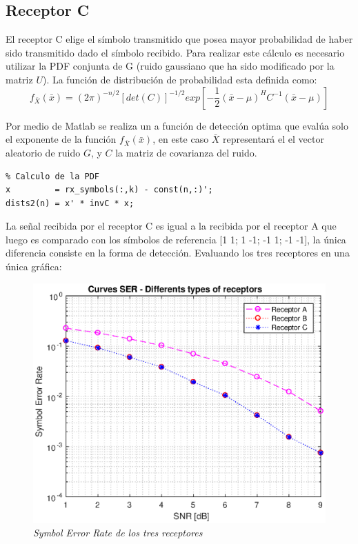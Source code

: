 \documentclass	[12pt,A4paper,titlepage]{article}
\begin{document}
\subsection{Receptor C}
El receptor C elige el símbolo transmitido que posea mayor probabilidad de haber sido transmitido dado el símbolo recibido. Para realizar este cálculo es necesario utilizar la PDF conjunta de G (ruido gaussiano que ha sido modificado por la matriz $U$).
La función de distribución de probabilidad esta definida como:
\[ 	f_{\bar{X}}(\bar{x})=
	(2\pi)^{-n/2} [\textit{det}(C)]^{-1/2} \textit{exp} \left[ -\dfrac{1}{2} (\bar{x}-\mu)^H C^{-1} (\bar{x}-\mu) \right] \]

Por medio de Matlab se realiza un a función de detección optima que evalúa solo el exponente de la función $f_{\bar{X}}(\bar{x})$, en este caso $\bar{X}$ representará el el vector aleatorio de ruido $G$, y $C$ la matriz de covarianza del ruido.
\begin{verbatim}
% Calculo de la PDF
x         = rx_symbols(:,k) - const(n,:)';
dists2(n) = x' * invC * x;
\end{verbatim}

La señal recibida por el receptor C es igual a la recibida por el receptor A que luego es comparado con los símbolos de referencia [1 1; 1 -1; -1 1; -1 -1], la única diferencia consiste en la forma de detección. Evaluando los tres receptores en una única gráfica: 
\begin{figure}[H]
	\centering
	\includegraphics[width=0.7\linewidth]{figuras/Curves}
	\caption{\textit{Symbol Error Rate de los tres receptores}}
	\label{fig:curves}
\end{figure}


\newpage
\end{document}
